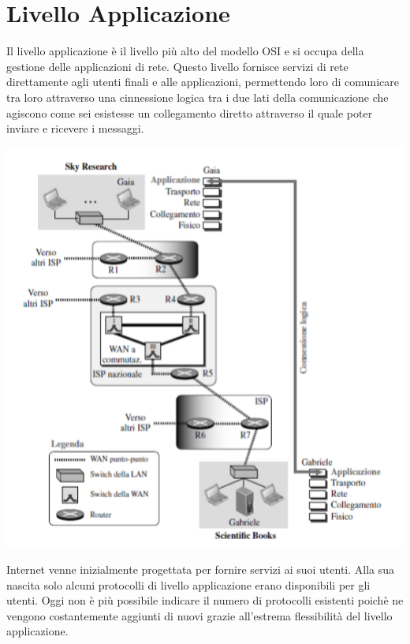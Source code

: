 \documentclass[12pt]{report}
\begin{document}
	\chapter{Livello Applicazione}
	Il livello applicazione è il livello più alto del modello OSI e si occupa della gestione delle applicazioni di rete. Questo livello fornisce servizi di rete direttamente agli utenti finali e alle applicazioni, permettendo loro di comunicare tra loro attraverso una cinnessione logica tra i due lati della comunicazione che agiscono come sei esistesse un collegamento diretto attraverso il quale poter inviare e ricevere i messaggi. 
	\begin{center}
		\includegraphics[scale=0.5]{assets/app_lvl.png}
	\end{center}
	Internet venne inizialmente progettata per fornire servizi ai suoi utenti. Alla sua nascita solo alcuni protocolli di livello applicazione erano disponibili per gli utenti. Oggi non è più possibile indicare il numero di protocolli esistenti poichè ne vengono costantemente aggiunti di nuovi grazie all'estrema flessibilità del livello applicazione.
\end{document}

